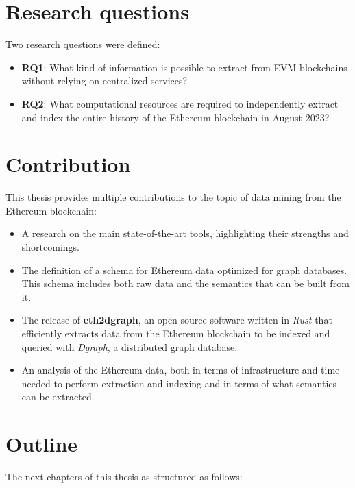 \section{Research questions}

Two research questions were defined:

\begin{itemize}
    \item \textbf{RQ1}: What kind of information is possible to extract from EVM blockchains without relying on centralized services?
    \item \textbf{RQ2}: What computational resources are required to independently extract and index the entire history of the Ethereum blockchain in August 2023?
\end{itemize} 

\section{Contribution}

This thesis provides multiple contributions to the topic of data mining from the Ethereum blockchain:

\begin{itemize}
    \item A research on the main state-of-the-art tools, highlighting their strengths and shortcomings.
    \item The definition of a schema for Ethereum data optimized for graph databases. This schema includes both raw data and the semantics that can be built from it.
    \item The release of \textbf{eth2dgraph}, an open-source software written in \textit{Rust} that efficiently extracts data from the Ethereum blockchain to be indexed and queried with \textit{Dgraph}, a distributed graph database. 
    \item An analysis of the Ethereum data, both in terms of infrastructure and time needed to perform extraction and indexing and in terms of what semantics can be extracted.
\end{itemize}

\section{Outline}

The next chapters of this thesis as structured as follows:

